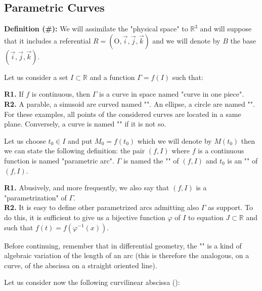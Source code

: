 {	\subsection{Parametric Curves}
	\textbf{Definition (\#\mydef):} We will assimilate the "physical space" to $\mathbb{R}^3$ and will suppose that it includes a referential $R=(\text{O},\vec{i},\vec{j},\vec{k})$ and we will denote by $B$ the base $(\vec{i},\vec{j},\vec{k})$.
	
	Let us consider a set $I \subset \mathbb{R}$ and a function $\Gamma=f(I)$ such that:
	
	\begin{tcolorbox}[title=Remarks,colframe=black,arc=10pt]
	\textbf{R1.} If $f$ is continuous, then $\Gamma$ is a curve in space named "curve in one piece".\\
	
	\textbf{R2.} A parable, a sinusoid are curved named  "". An ellipse, a circle are named "". For these examples, all points of the considered curves are located in a same plane. Conversely, a curve is named "" if it is not so.
	\end{tcolorbox}
	Let us choose $t_0 \in I$ and put $M_0=f(t_0)$ which we will denote by $M(t_0)$ then we can state the following definition: the pair $(f, I)$ where $f$ is a continuous function is named "parametric arc". $\Gamma$ is named the "" of $(f, I)$ and $t_0$ is an "" of $(f, I)$.
	\begin{tcolorbox}[title=Remarks,colframe=black,arc=10pt]
	\textbf{R1.} Abusively, and more frequently, we also say that $(f, I)$ is a "parametrization" of $\Gamma$.\\
	
	\textbf{R2.} It is easy to define other parametrized arcs admitting also $\Gamma$ as support. To do this, it is sufficient to give us a bijective function $\varphi$ of $I$ to equation $J\subset \mathbb{R}$ and such that $f(t)=f(\varphi^{-1}(x))$.
	\end{tcolorbox}
	Before continuing, remember that in differential geometry, the "" is a kind of algebraic variation of the length of an arc (this is therefore the analogous, on a curve, of the abscissa on a straight oriented line).
	
	Let us consider now the following curvilinear abscissa ():
	
}
